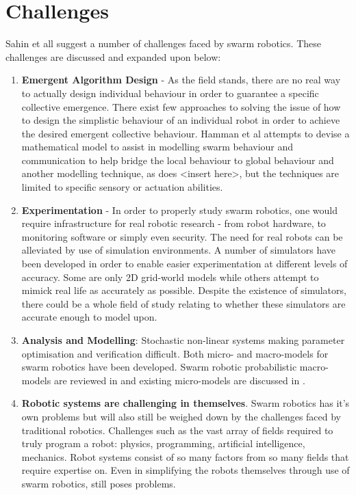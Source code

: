\section{Challenges}
Sahin et all suggest a number of challenges faced by swarm robotics\cite{csahin2008special}. These challenges are discussed and expanded upon below: 
\begin{enumerate}
\item \textbf{Emergent Algorithm Design} - As the field stands, there are no real way to actually design individual behaviour in order to guarantee a specific collective emergence. There exist few approaches to solving the issue of how to design the simplistic behaviour of an individual robot in order to achieve the desired emergent collective behaviour. Hamman et al attempts to devise a mathematical model to assist in modelling swarm behaviour and communication\cite{hamann2008framework} to help bridge the local behaviour to global behaviour and another modelling technique, as does <insert here>, but the techniques are limited to specific sensory or actuation abilities. %
\item \textbf{Experimentation} - In order to properly study swarm robotics, one would require infrastructure for real robotic research - from robot hardware, to monitoring software or simply even security. The need for real robots can be alleviated by use of simulation environments. A number of simulators have been developed in order to enable easier experimentation at different levels of accuracy. Some are only 2D grid-world models while others attempt to mimick real life as accurately as possible. Despite the existence of simulators, there could be a whole field of study relating to whether these simulators are accurate enough to model upon.
\item \textbf{Analysis and Modelling}: Stochastic non-linear systems making parameter optimisation and verification difficult. Both micro- and macro-models for swarm robotics have been developed. Swarm robotic probabilistic macro-models are reviewed in\cite{lerman2005review} and existing micro-models are discussed in \cite{}. %
\item \textbf{Robotic systems are challenging in themselves}. Swarm robotics has it's own problems but will also still be weighed down by the challenges faced by traditional robotics. Challenges such as the vast array of fields required to truly program a robot: physics, programming, artificial intelligence, mechanics. Robot systems consist of so many factors from so many fields that require expertise on. Even in simplifying the robots themselves through use of swarm robotics, still poses problems. %
\end{enumerate}


